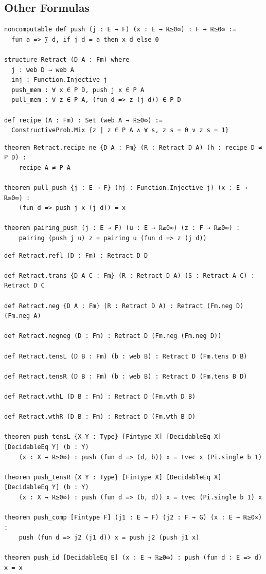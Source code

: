 \subsection{Other Formulas}

\begin{lstlisting}
noncomputable def push (j : E → F) (x : E → ℝ≥0∞) : F → ℝ≥0∞ :=
  fun a => ∑ d, if j d = a then x d else 0

structure Retract (D A : Fm) where
  j : web D → web A
  inj : Function.Injective j
  push_mem : ∀ x ∈ P D, push j x ∈ P A
  pull_mem : ∀ z ∈ P A, (fun d => z (j d)) ∈ P D

def recipe (A : Fm) : Set (web A → ℝ≥0∞) :=
  ConstructiveProb.Mix {z | z ∈ P A ∧ ∀ s, z s = 0 ∨ z s = 1}
\end{lstlisting}

\begin{lstlisting}
theorem Retract.recipe_ne {D A : Fm} (R : Retract D A) (h : recipe D ≠ P D) :
    recipe A ≠ P A

theorem pull_push {j : E → F} (hj : Function.Injective j) (x : E → ℝ≥0∞) :
    (fun d => push j x (j d)) = x

theorem pairing_push (j : E → F) (u : E → ℝ≥0∞) (z : F → ℝ≥0∞) :
    pairing (push j u) z = pairing u (fun d => z (j d))
\end{lstlisting}

\begin{lstlisting}
def Retract.refl (D : Fm) : Retract D D

def Retract.trans {D A C : Fm} (R : Retract D A) (S : Retract A C) : Retract D C

def Retract.neg {D A : Fm} (R : Retract D A) : Retract (Fm.neg D) (Fm.neg A)

def Retract.negneg (D : Fm) : Retract D (Fm.neg (Fm.neg D))

def Retract.tensL (D B : Fm) (b : web B) : Retract D (Fm.tens D B)

def Retract.tensR (D B : Fm) (b : web B) : Retract D (Fm.tens B D)

def Retract.wthL (D B : Fm) : Retract D (Fm.wth D B)

def Retract.wthR (D B : Fm) : Retract D (Fm.wth B D)

theorem push_tensL {X Y : Type} [Fintype X] [DecidableEq X] [DecidableEq Y] (b : Y)
    (x : X → ℝ≥0∞) : push (fun d => (d, b)) x = tvec x (Pi.single b 1)

theorem push_tensR {X Y : Type} [Fintype X] [DecidableEq X] [DecidableEq Y] (b : Y)
    (x : X → ℝ≥0∞) : push (fun d => (b, d)) x = tvec (Pi.single b 1) x

theorem push_comp [Fintype F] (j1 : E → F) (j2 : F → G) (x : E → ℝ≥0∞) :
    push (fun d => j2 (j1 d)) x = push j2 (push j1 x)

theorem push_id [DecidableEq E] (x : E → ℝ≥0∞) : push (fun d : E => d) x = x
\end{lstlisting}

